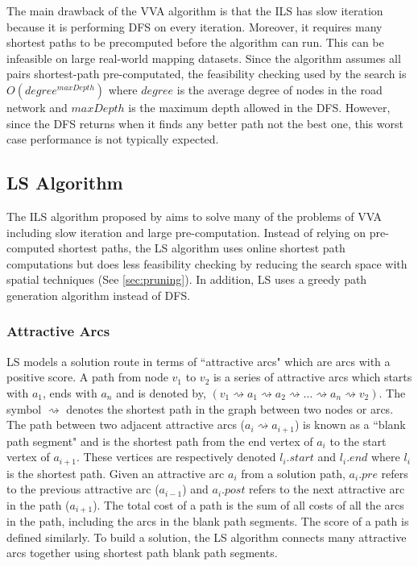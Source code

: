 \documentclass[honors]{union-cs-thesis}
\newcommand{\spa}{\rightsquigarrow}
\begin{document}
The main drawback of the VVA algorithm is that the ILS has slow iteration because it is performing DFS on every iteration.  Moreover, it requires many shortest paths to be precomputed before the algorithm can run. This can be infeasible on large real-world  mapping datasets. Since the algorithm assumes all pairs shortest-path pre-computated, the feasibility checking used by the search is $O(degree^{maxDepth})$ where $degree$ is the average degree of nodes in the road network and $maxDepth$ is the maximum depth allowed in the DFS. However, since the DFS returns when it finds any better path not the best one, this worst case performance is not typically expected.

\subsection{LS Algorithm}
\label{sec:ls-algo}
The ILS algorithm proposed by \citeauthor{lu2015arc} aims to solve many of the problems of VVA including slow iteration and large pre-computation. Instead of relying on pre-computed shortest paths, the LS algorithm uses online shortest path computations but does less feasibility checking by reducing the search space with spatial techniques (See \cref{sec:pruning}). In addition, LS uses a greedy path generation algorithm instead of DFS.

\subsubsection{Attractive Arcs}
LS models a solution route in terms of ``attractive arcs" which are arcs with a positive score. A path from node $v_1$ to $v_2$ is a series of attractive arcs which starts with $a_1$, ends with $a_n$ and is denoted by, $(v_1 \spa a_1 \spa a_2 \spa \ldots \spa a_n \spa v_2)$. The symbol $\spa$ denotes the shortest path in the graph between two nodes or arcs. The path between two adjacent attractive arcs ($a_i \spa  a_{i+1}$) is known as a ``blank path segment" and is the shortest path from the end vertex of $a_i$ to the start vertex of $a_{i+1}$. These vertices are respectively denoted $l_i.start$ and $l_i.end$ where $l_i$ is the shortest path. Given an attractive arc $a_i$ from a solution path, $a_i.pre$ refers to the previous attractive arc ($a_{i-1}$) and $a_i.post$ refers to the next attractive arc in the path ($a_{i+1}$). The total cost of a path is the sum of all costs of all the arcs in the path, including the arcs in the blank path segments. The score of a path is defined similarly. To build a solution, the LS algorithm connects many attractive arcs together using shortest path blank path segments.
\end{document}
